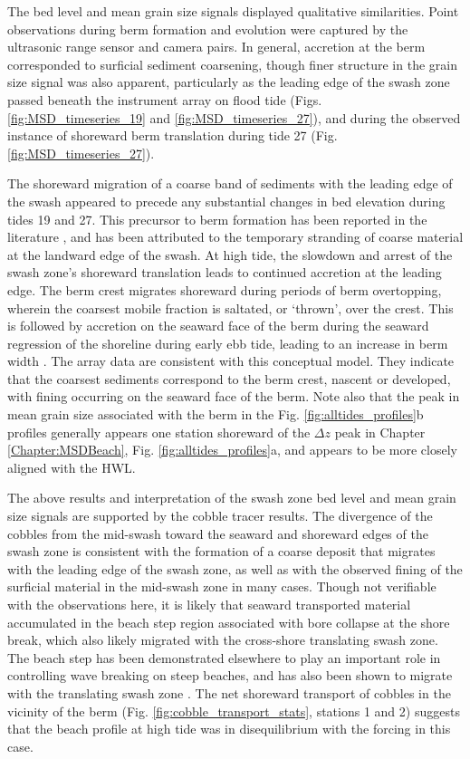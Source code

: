The bed level and mean grain size signals displayed qualitative similarities. Point observations during berm formation and evolution were captured by the ultrasonic range sensor and camera pairs. In general, accretion at the berm corresponded to surficial sediment coarsening, though finer structure in the grain size signal was also apparent, particularly as the leading edge of the swash zone passed beneath the instrument array on flood tide (Figs. \ref{fig:MSD_timeseries_19} and \ref{fig:MSD_timeseries_27}), and during the observed instance of shoreward berm translation during tide 27 (Fig. \ref{fig:MSD_timeseries_27}). 

The shoreward migration of a coarse band of sediments with the leading edge of the swash appeared to precede any substantial changes in bed elevation during tides 19 and 27. This precursor to berm formation has been reported in the literature \citep[e.g.,][]{Austin_Buscombe2008, Duncan1964}, and has been attributed to the temporary stranding of coarse material at the landward edge of the swash. At high tide, the slowdown and arrest of the swash zone's shoreward translation leads to continued accretion at the leading edge. The berm crest migrates shoreward during periods of berm overtopping, wherein the coarsest mobile fraction is saltated, or `thrown', over the crest. This is followed by accretion on the seaward face of the berm during the seaward regression of the shoreline during early ebb tide, leading to an increase in berm width \citep[e.g.,][]{Pontee_etal2004, Austin_Masselink2006}. The array data are consistent with this conceptual model. They indicate that the coarsest sediments correspond to the berm crest, nascent or developed, with fining occurring on the seaward face of the berm. Note also that the peak in mean grain size associated with the berm in the Fig. \ref{fig:alltides_profiles}b profiles generally appears one station shoreward of the $\Delta z$ peak in Chapter \ref{Chapter:MSDBeach}, Fig. \ref{fig:alltides_profiles}a, and appears to be more closely aligned with the HWL.

The above results and interpretation of the swash zone bed level and mean grain size signals are supported by the cobble tracer results. The divergence of the cobbles from the mid-swash toward the seaward and shoreward edges of the swash zone is consistent with the formation of a coarse deposit that migrates with the leading edge of the swash zone, as well as with the observed fining of the surficial material in the mid-swash zone in many cases. Though not verifiable with the observations here, it is likely that seaward transported material accumulated in the beach step region associated with bore collapse at the shore break, which also likely migrated with the cross-shore translating swash zone. The beach step has been demonstrated elsewhere to play an important role in controlling wave breaking on steep beaches, and has also been shown to migrate with the translating swash zone \citep{Austin_Buscombe2008}. The net shoreward transport of cobbles in the vicinity of the berm (Fig. \ref{fig:cobble_transport_stats}, stations 1 and 2) suggests that the beach profile at high tide was in disequilibrium with the forcing in this case.

